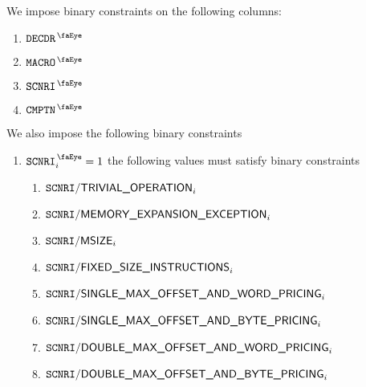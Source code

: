 We impose binary constraints on the following columns:
\begin{multicols}{4}
	\begin{enumerate}
		\item $\isMxpInstructionDecoder$
		\item $\isMxpMacro             $
		\item $\isMxpScenario          $
		\item $\isMxpComputation       $
	\end{enumerate}
\end{multicols}

We also impose the following binary constraints
\begin{enumerate}
	\item \If $\isMxpScenario _{i} = 1$ \Then the following values must satisfy binary constraints
		\begin{enumerate}
			\item $\texttt{SCNRI}\textsf{/}{\textsf{TRIVIAL\_OPERATION}}              _{i}$
			\item $\texttt{SCNRI}\textsf{/}{\textsf{MEMORY\_EXPANSION\_EXCEPTION}}      _{i}$
			\item $\texttt{SCNRI}\textsf{/}{\textsf{MSIZE}}                         _{i}$
			\item $\texttt{SCNRI}\textsf{/}{\textsf{FIXED\_SIZE\_INSTRUCTIONS}}         _{i}$
			\item $\texttt{SCNRI}\textsf{/}{\textsf{SINGLE\_MAX\_OFFSET\_AND\_WORD\_PRICING}} _{i}$
			\item $\texttt{SCNRI}\textsf{/}{\textsf{SINGLE\_MAX\_OFFSET\_AND\_BYTE\_PRICING}} _{i}$
			\item $\texttt{SCNRI}\textsf{/}{\textsf{DOUBLE\_MAX\_OFFSET\_AND\_WORD\_PRICING}} _{i}$
			\item $\texttt{SCNRI}\textsf{/}{\textsf{DOUBLE\_MAX\_OFFSET\_AND\_BYTE\_PRICING}} _{i}$
		\end{enumerate}
\end{enumerate}
